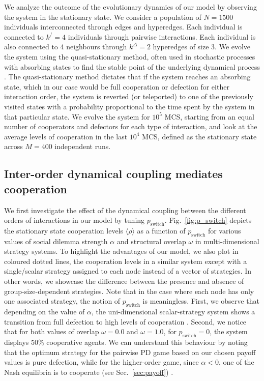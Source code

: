 \documentclass[a4paper,pre,reqno,superscriptaddress,twocolumn, floatfix]{revtex4}
\begin{document}
We analyze the outcome of the evolutionary dynamics of our model by observing the system in the stationary state. We consider a population of $N=1500$ individuals interconnected through edges and hyperedges. Each individual is connected to $k^/=4$ individuals through pairwise interactions. Each individual is also connected to 4 neighbours through $k^{\Delta} = 2$ hyperedges of size 3. We evolve the system using the quasi-stationary method, often used in stochastic processes with absorbing states to find the stable point of the underlying dynamical process \cite{de_oliveira_how_2005, zhou_evolutionary_2010,  faure_quasi-stationary_2014, sander_sampling_2016}. The quasi-stationary method dictates that if the system reaches an absorbing state, which in our case would be full cooperation or defection for either interaction order, the system is reverted (or teleported) to one of the previously visited states with a probability proportional to the time spent by the system in that particular state. We evolve the system for $10^5$ MCS, starting from an equal number of cooperators and defectors for each type of interaction, and look at the average levels of cooperation in the last $10^4$ MCS, defined as the stationary state across $M=400$ independent runs.



\subsection{Inter-order dynamical coupling mediates cooperation}


We first investigate the effect of the dynamical coupling between the different orders of interactions in our model by tuning $p_{\text{switch}}$. Fig.~\eqref{fig:p_switch} depicts the stationary state cooperation levels $\langle \rho \rangle$ as a function of $p_{\text{switch}}$ for various values of social dilemma strength $\alpha$ and structural overlap $\omega$ in multi-dimensional strategy systems. To highlight the advantages of our model, we also plot in coloured dotted lines, the cooperation levels in a similar system except with a single/scalar strategy assigned to each node instead of a vector of strategies. In other words, we showcase the difference between the presence and absence of group-size-dependent strategies.  Note that in the case where each node has only one associated strategy, the notion of $p_{\text{switch}}$ is meaningless. First, we observe that depending on the value of $\alpha$, the uni-dimensional scalar-strategy system shows a transition from full defection to high levels of cooperation \cite{civilini_explosive_2024}. Second, we notice that for both values of overlap $\omega=0.0$ and $\omega=1.0$, for $p_{\text{switch}} = 0$, the system displays 50\% cooperative agents. We can understand this behaviour by noting that the optimum strategy for the pairwise PD game based on our chosen payoff values is pure defection, while for the higher-order game, since $\alpha < 0$, one of the Nash equilibria is to cooperate (see Sec.~\eqref{sec:payoff}) \cite{gokhale_evolutionary_2010, civilini_explosive_2024}.
\end{document}
